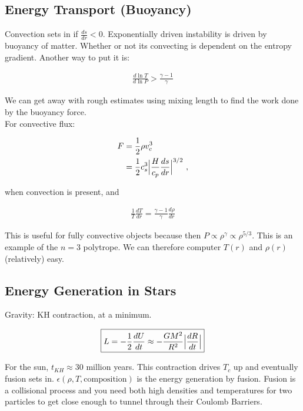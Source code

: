 \documentclass[10pt,letterpaper,final]{book}
\newcommand{\pt}{\propto}
\begin{document}
\subsection{Energy Transport (Buoyancy)}

Convection sets in if $\frac{ds}{dr} < 0$. Exponentially driven instability is driven by buoyancy of matter. Whether or not its convecting is dependent on the entropy gradient. Another way to put it is:

\begin{align}
\frac{d \ln T}{d \ln P} > \frac{\gamma -1}{\gamma}
\end{align}

We can get away with rough estimates using mixing length to find the work done by the buoyancy force. \\
For convective flux:

\begin{align}
F &= \frac{1}{2}\rho v_c^3\\
&= \frac{1}{2} c_s^3 \Bigl\lvert \frac{H}{c_p} \frac{ds}{dr} \Bigl\lvert ^{3/2}~,
\end{align}

when convection is present, and

\begin{align}
\boxed{\frac{1}{T}\frac{dT}{dr} = \frac{\gamma -1}{\gamma} \frac{d\rho}{dr}}
\end{align}

This is useful for fully convective objects because then $P \pt \rho^\gamma \pt \rho^{5/3}$. This is an example of the $n=3$ polytrope. We can therefore computer $T(r)$ and $\rho(r)$ (relatively) easy.

\subsection{Energy Generation in Stars}


Gravity: KH contraction, at a minimum. 

\begin{align}
\boxed{L = -\frac{1}{2}\frac{dU}{dt}\approx -\frac{GM^2}{R^2} \Bigl\lvert \frac{dR}{dt} \Bigl\lvert}
\end{align}

For the sun, $t_{KH} \approx 30$ million years. This contraction drives $T_c$ up and eventually fusion sets in. $\epsilon(\rho,T,\text{composition})$ is the energy generation by fusion. Fusion is a collisional process and you need both high densities and temperatures for two particles to get close enough to tunnel through their Coulomb Barriers. 
\end{document}
